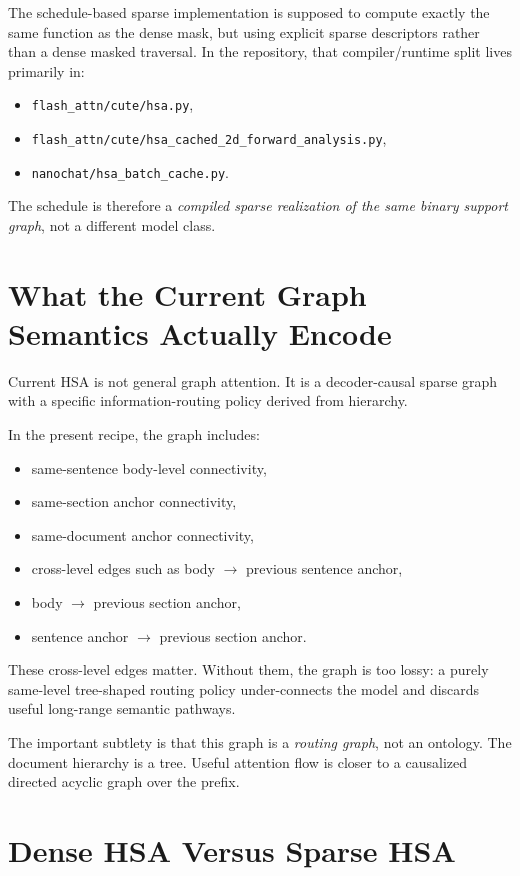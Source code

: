 \documentclass[11pt]{article}
\begin{document}
The schedule-based sparse implementation is supposed to compute exactly the same
function as the dense mask, but using explicit sparse descriptors rather than a
dense masked traversal. In the repository, that compiler/runtime split lives
primarily in:
\begin{itemize}[leftmargin=1.5em]
    \item \texttt{flash\_attn/cute/hsa.py},
    \item \texttt{flash\_attn/cute/hsa\_cached\_2d\_forward\_analysis.py},
    \item \texttt{nanochat/hsa\_batch\_cache.py}.
\end{itemize}

The schedule is therefore a \emph{compiled sparse realization of the same
binary support graph}, not a different model class.

\section{What the Current Graph Semantics Actually Encode}

Current HSA is not general graph attention. It is a decoder-causal sparse graph
with a specific information-routing policy derived from hierarchy.

In the present recipe, the graph includes:
\begin{itemize}[leftmargin=1.5em]
    \item same-sentence body-level connectivity,
    \item same-section anchor connectivity,
    \item same-document anchor connectivity,
    \item cross-level edges such as body $\rightarrow$ previous sentence anchor,
    \item body $\rightarrow$ previous section anchor,
    \item sentence anchor $\rightarrow$ previous section anchor.
\end{itemize}

These cross-level edges matter. Without them, the graph is too lossy: a purely
same-level tree-shaped routing policy under-connects the model and discards
useful long-range semantic pathways.

The important subtlety is that this graph is a \emph{routing graph}, not an
ontology. The document hierarchy is a tree. Useful attention flow is closer to a
causalized directed acyclic graph over the prefix.

\section{Dense HSA Versus Sparse HSA}
\end{document}
